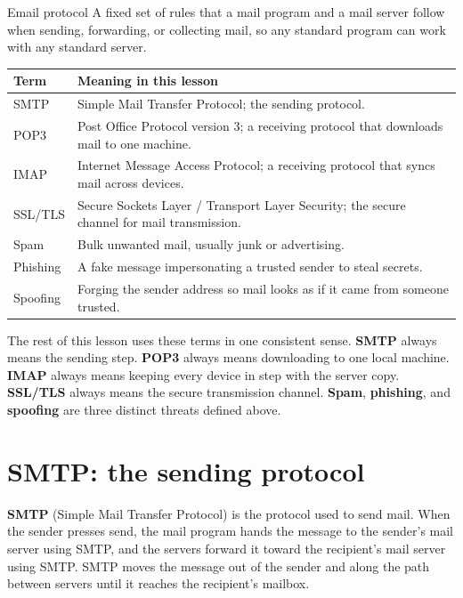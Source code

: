 \begin{definitionbox}{Email protocol}
A fixed set of rules that a mail program and a mail server follow when
sending, forwarding, or collecting mail, so any standard program can work
with any standard server.
\end{definitionbox}

\begin{center}
\begin{tabular}{p{}p{}}
\toprule
\textbf{Term} & \textbf{Meaning in this lesson} \\
\midrule
SMTP & Simple Mail Transfer Protocol; the sending protocol. \\
POP3 & Post Office Protocol version 3; a receiving protocol that downloads mail to one machine. \\
IMAP & Internet Message Access Protocol; a receiving protocol that syncs mail across devices. \\
SSL/TLS & Secure Sockets Layer / Transport Layer Security; the secure channel for mail transmission. \\
Spam & Bulk unwanted mail, usually junk or advertising. \\
Phishing & A fake message impersonating a trusted sender to steal secrets. \\
Spoofing & Forging the sender address so mail looks as if it came from someone trusted. \\
\bottomrule
\end{tabular}
\end{center}

The rest of this lesson uses these terms in one consistent sense.
\textbf{SMTP} always means the sending step. \textbf{POP3} always means
downloading to one local machine. \textbf{IMAP} always means keeping every
device in step with the server copy. \textbf{SSL/TLS} always means the
secure transmission channel. \textbf{Spam}, \textbf{phishing}, and
\textbf{spoofing} are three distinct threats defined above.

\section{SMTP: the sending protocol}
\textbf{SMTP} (Simple Mail Transfer Protocol) is the protocol used to send
mail. When the sender presses send, the mail program hands the message to
the sender's mail server using SMTP, and the servers forward it toward the
recipient's mail server using SMTP. SMTP moves the message out of the
sender and along the path between servers until it reaches the recipient's
mailbox.


